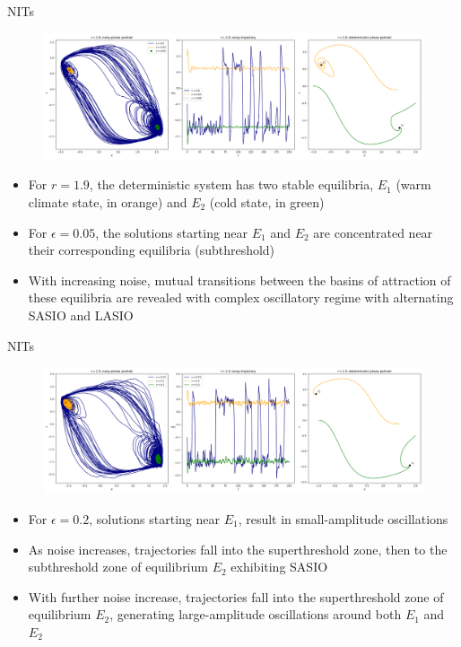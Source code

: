 \documentclass[10pt]{beamer}
\begin{document}
\begin{frame}{NITs}
	\begin{figure}
		\includegraphics[width=\textwidth, height=0.52\textheight,keepaspectratio]{./figures_2/NIT-r2.png}
	\end{figure}

	\begin{itemize}
		\item For $r = 1.9$, the deterministic system 
		has two stable equilibria, $E_1$ (warm climate state, in orange) and $E_2$ (cold state, in green)
		\item For $\epsilon = 0.05$, the solutions starting near $E_1$ and $E_2$ 
		are concentrated near their corresponding equilibria (subthreshold)
		\item With increasing noise, mutual transitions between 
		the basins of attraction of these equilibria are revealed with complex 
		oscillatory regime with alternating SASIO and LASIO
	\end{itemize}
\end{frame}

\begin{frame}{NITs}
	\begin{figure}
	\includegraphics[width=\textwidth, height=\textheight,keepaspectratio]{figures_2/NIT-r2.5.png}
	\end{figure}
	
	\begin{itemize}
		\item For $\epsilon = 0.2$, solutions starting near $E_1$, result in 
		small-amplitude oscillations
		\item As noise increases, trajectories fall into the superthreshold zone, 
		then to the subthreshold zone of equilibrium $E_2$ exhibiting SASIO
		\item With further noise increase, trajectories fall into the superthreshold 
		zone of equilibrium $E_2$, generating large-amplitude oscillations around both 
		$E_1$ and $E_2$
	\end{itemize}
\end{frame}
\end{document}
